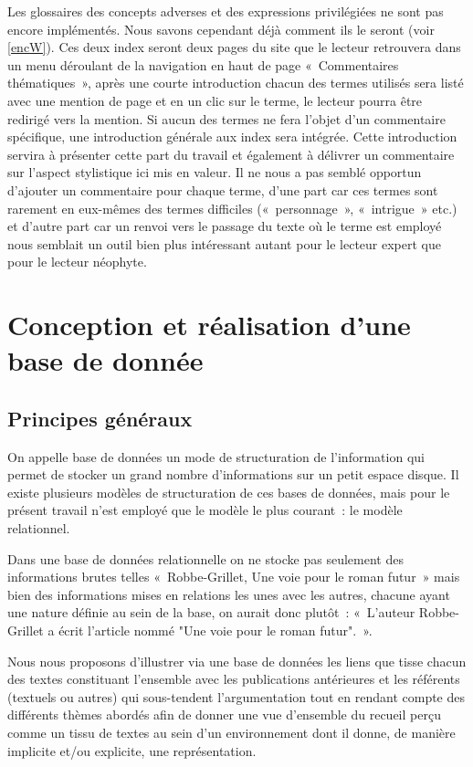 \documentclass[12pt, a4paper]{article}
\begin{document}
Les glossaires des concepts adverses et des expressions privilégiées ne sont pas encore implémentés. Nous savons cependant déjà comment ils le seront (voir \ref{encW}). Ces deux index seront deux pages du site que le lecteur retrouvera dans un menu déroulant de la navigation en haut de page «~Commentaires thématiques~», après une courte introduction chacun des termes utilisés sera listé avec une mention de page et en un clic sur le terme, le lecteur pourra être redirigé vers la mention. Si aucun des termes ne fera l'objet d'un commentaire spécifique, une introduction générale aux index sera intégrée. Cette introduction servira à présenter cette part du travail et également à délivrer un commentaire sur l'aspect stylistique ici mis en valeur. Il ne nous a pas semblé opportun d'ajouter un commentaire pour chaque terme, d'une part car ces termes sont rarement en eux-mêmes des termes difficiles («~personnage~», «~intrigue~» etc.) et d'autre part car un renvoi vers le passage du texte où le terme est employé nous semblait un outil bien plus intéressant autant pour le lecteur expert que pour le lecteur néophyte.





\section{Conception et réalisation d'une base de donnée}
    \subsection{Principes généraux}
    On appelle base de données un mode de structuration de l'information qui permet de stocker un grand nombre d'informations sur un petit espace disque. Il existe plusieurs modèles de structuration de ces bases de données, mais pour le présent travail n'est employé que le modèle le plus courant~: le modèle relationnel.

    Dans une base de données relationnelle on ne stocke pas seulement des informations brutes telles «~Robbe-Grillet, Une voie pour le roman futur~» mais bien des informations mises en relations les unes avec les autres, chacune ayant une nature définie au sein de la base, on aurait donc plutôt~: «~L'auteur Robbe-Grillet a écrit l'article nommé "Une voie pour le roman futur".~».

    Nous nous proposons d'illustrer via une base de données les liens que tisse chacun des textes constituant l'ensemble avec les publications antérieures et les référents (textuels ou autres) qui sous-tendent l'argumentation tout en rendant compte des différents thèmes abordés afin de donner une vue d'ensemble du recueil perçu comme un tissu de textes au sein d'un environnement dont il donne, de manière implicite et/ou explicite, une représentation.
\end{document}
